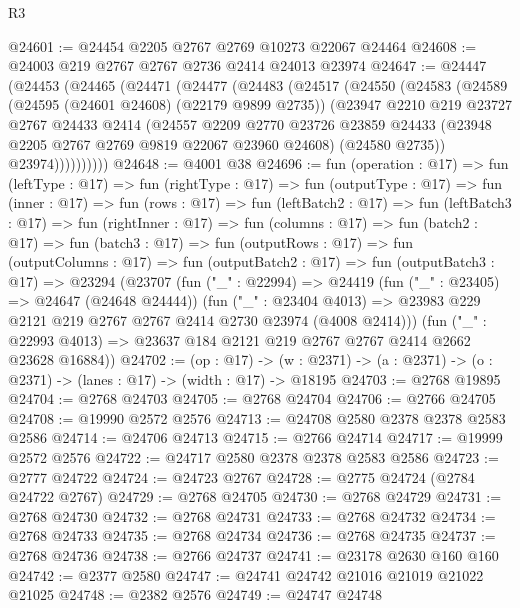 \begin{lexlean}{R3}
\begin{coremodule}
@24601 := @24454 @2205 @2767 @2769 @10273 @22067 @24464
@24608 := @24003 @219 @2767 @2767 @2736 @2414 @24013 @23974
@24647 := @24447
    (@24453
      (@24465
        (@24471
          (@24477
            (@24483
              (@24517
                (@24550
                  (@24583
                    (@24589
                      (@24595 (@24601 @24608) (@22179 @9899 @2735))
                      (@23947
                        @2210
                        @219
                        @23727
                        @2767
                        @24433
                        @2414
                        (@24557
                          @2209
                          @2770
                          @23726
                          @23859
                          @24433
                          (@23948 @2205 @2767 @2769 @9819 @22067 @23960 @24608)
                          (@24580 @2735))
                        @23974))))))))))
@24648 := @4001 @38
@24696 := fun (operation : @17) =>
  fun (leftType : @17) =>
  fun (rightType : @17) =>
  fun (outputType : @17) =>
  fun (inner : @17) =>
  fun (rows : @17) =>
  fun (leftBatch2 : @17) =>
  fun (leftBatch3 : @17) =>
  fun (rightInner : @17) =>
  fun (columns : @17) =>
  fun (batch2 : @17) =>
  fun (batch3 : @17) =>
  fun (outputRows : @17) =>
  fun (outputColumns : @17) =>
  fun (outputBatch2 : @17) =>
  fun (outputBatch3 : @17) =>
  @23294
    (@23707
      (fun ("_" : @22994) =>
      @24419
        (fun ("_" : @23405) => @24647 (@24648 @24444))
        (fun ("_" : @23404 @4013) =>
        @23983 @229 @2121 @219 @2767 @2767 @2414 @2730 @23974 (@4008 @2414)))
      (fun ("_" : @22993 @4013) => @23637 @184 @2121 @219 @2767 @2767 @2414 @2662 @23628 @16884))
@24702 := (op : @17) ->
  (w : @2371) -> (a : @2371) -> (o : @2371) -> (lanes : @17) -> (width : @17) -> @18195
@24703 := @2768 @19895
@24704 := @2768 @24703
@24705 := @2768 @24704
@24706 := @2766 @24705
@24708 := @19990 @2572 @2576
@24713 := @24708 @2580 @2378 @2378 @2583 @2586
@24714 := @24706 @24713
@24715 := @2766 @24714
@24717 := @19999 @2572 @2576
@24722 := @24717 @2580 @2378 @2378 @2583 @2586
@24723 := @2777 @24722
@24724 := @24723 @2767
@24728 := @2775 @24724 (@2784 @24722 @2767)
@24729 := @2768 @24705
@24730 := @2768 @24729
@24731 := @2768 @24730
@24732 := @2768 @24731
@24733 := @2768 @24732
@24734 := @2768 @24733
@24735 := @2768 @24734
@24736 := @2768 @24735
@24737 := @2768 @24736
@24738 := @2766 @24737
@24741 := @23178 @2630 @160 @160
@24742 := @2377 @2580
@24747 := @24741 @24742 @21016 @21019 @21022 @21025
@24748 := @2382 @2576
@24749 := @24747 @24748

\end{coremodule}
\end{lexlean}
